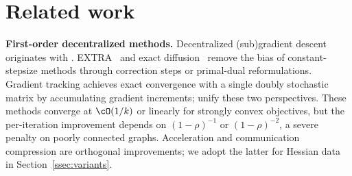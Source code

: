 \documentclass[review,onefignum,onetabnum]{siamart171218}
\begin{document}
	\section{Related work}\label{sec:related}
	
	\noindent\textbf{First-order decentralized methods.}
	Decentralized (sub)gradient descent originates with
	\citet{nedic2009subgradient}.
	EXTRA~\citep{shi2015extra} and exact
	diffusion~\citep{yuan2019exactdiffusion} remove the bias of
	constant-stepsize methods through correction steps or primal-dual
	reformulations.
	Gradient tracking
	\citep{nedic2017diging,xin2020distributed,pu2021distributed}
	achieves exact convergence with a single doubly stochastic matrix
	by accumulating gradient increments;
	\citet{alghunaim2021decentralized} unify these two perspectives.
	These methods converge at $\cO(1/k)$ or linearly for strongly convex
	objectives, but the per-iteration improvement depends on
	$(1-\rho)^{-1}$ or $(1-\rho)^{-2}$, a severe penalty on poorly
	connected graphs.
	Acceleration \citep{jakovetic2014fast,li2024decentralized} and
	communication compression
	\citep{koloskova2019decentralized,beznosikov2022biased} are
	orthogonal improvements; we adopt the latter for Hessian data
	in Section~\ref{ssec:variants}.
\end{document}
